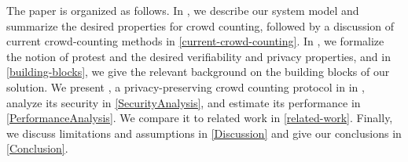 
The paper is organized as follows.
In , we describe our system model and summarize the desired 
properties for crowd counting, followed by a discussion of current 
crowd-counting methods in \cref{current-crowd-counting}. In , 
we formalize the notion of protest and the desired verifiability and privacy 
properties, and in \cref{building-blocks}, we give the relevant background on 
the building blocks of our solution.
%
%
We present \CROCUS, a privacy-preserving crowd counting 
protocol in in , analyze its security in \cref{SecurityAnalysis}, and estimate its performance in \cref{PerformanceAnalysis}.
We compare it to related work in \cref{related-work}.
Finally, we discuss limitations and assumptions in \cref{Discussion} and give 
our conclusions in \cref{Conclusion}.
